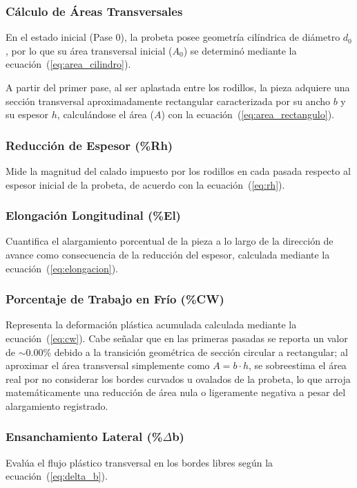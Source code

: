 \documentclass[journal]{IEEEtran}
\begin{document}
\subsubsection{Cálculo de Áreas Transversales}
En el estado inicial (Pase 0), la probeta posee geometría cilíndrica de diámetro $d_0$, por lo que su área transversal inicial ($A_0$) se determinó mediante la ecuación~(\ref{eq:area_cilindro}).

A partir del primer pase, al ser aplastada entre los rodillos, la pieza adquiere una sección transversal aproximadamente rectangular caracterizada por su ancho $b$ y su espesor $h$, calculándose el área ($A$) con la ecuación~(\ref{eq:area_rectangulo}).


\subsubsection{Reducción de Espesor (\%Rh)}
Mide la magnitud del calado impuesto por los rodillos en cada pasada respecto al espesor inicial de la probeta, de acuerdo con la ecuación~(\ref{eq:rh}).


\subsubsection{Elongación Longitudinal (\%El)}
Cuantifica el alargamiento porcentual de la pieza a lo largo de la dirección de avance como consecuencia de la reducción del espesor, calculada mediante la ecuación~(\ref{eq:elongacion}).


\subsubsection{Porcentaje de Trabajo en Frío (\%CW)}
Representa la deformación plástica acumulada calculada mediante la ecuación~(\ref{eq:cw}). Cabe señalar que en las primeras pasadas se reporta un valor de $\sim 0.00\%$ debido a la transición geométrica de sección circular a rectangular; al aproximar el área transversal simplemente como $A = b \cdot h$, se sobreestima el área real por no considerar los bordes curvados u ovalados de la probeta, lo que arroja matemáticamente una reducción de área nula o ligeramente negativa a pesar del alargamiento registrado.
\subsubsection{Ensanchamiento Lateral (\%\texorpdfstring{$\Delta$}{D}b)}
Evalúa el flujo plástico transversal en los bordes libres según la ecuación~(\ref{eq:delta_b}).
\end{document}
